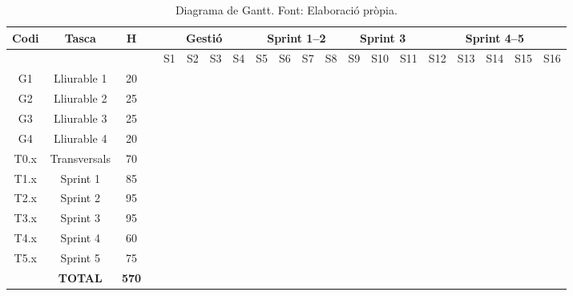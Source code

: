 \documentclass[12pt,a4paper,twoside]{report}
\begin{document}
\begin{table}[H]
\centering
\caption{Diagrama de Gantt. Font: Elaboraci\'o pr\`opia.}
\label{tab:gantt}
\small
\setlength{\tabcolsep}{2pt}
\begin{tabular}{@{}ccclcccccccccccccccc@{}}
\toprule
\textbf{Codi} & \textbf{Tasca} & \textbf{H} & & \multicolumn{4}{c}{\textbf{Gesti\'o}} & \multicolumn{4}{c}{\textbf{Sprint 1--2}} & \multicolumn{3}{c}{\textbf{Sprint 3}} & \multicolumn{5}{c}{\textbf{Sprint 4--5}} \\
\midrule
 & & & & S1 & S2 & S3 & S4 & S5 & S6 & S7 & S8 & S9 & S10 & S11 & S12 & S13 & S14 & S15 & S16 \\
\midrule
G1 & Lliurable 1 & 20 & & \cellcolor{blue!30} & \cellcolor{blue!30} & & & & & & & & & & & & & & \\
G2 & Lliurable 2 & 25 & & & \cellcolor{blue!30} & \cellcolor{blue!30} & & & & & & & & & & & & & \\
G3 & Lliurable 3 & 25 & & & & \cellcolor{blue!30} & \cellcolor{blue!30} & & & & & & & & & & & & \\
G4 & Lliurable 4 & 20 & & & & & \cellcolor{blue!30} & & & & & & & & & & & & \\
T0.x & Transversals & 70 & & \cellcolor{green!30} & \cellcolor{green!30} & \cellcolor{green!30} & \cellcolor{green!30} & \cellcolor{green!30} & \cellcolor{green!30} & \cellcolor{green!30} & \cellcolor{green!30} & \cellcolor{green!30} & \cellcolor{green!30} & \cellcolor{green!30} & \cellcolor{green!30} & \cellcolor{green!30} & \cellcolor{green!30} & \cellcolor{green!30} & \cellcolor{green!30} \\
T1.x & Sprint 1 & 85 & & \cellcolor{red!30} & \cellcolor{red!30} & \cellcolor{red!30} & \cellcolor{red!30} & \cellcolor{red!30} & & & & & & & & & & & \\
T2.x & Sprint 2 & 95 & & & & & & & \cellcolor{orange!30} & \cellcolor{orange!30} & \cellcolor{orange!30} & \cellcolor{orange!30} & & & & & & & \\
T3.x & Sprint 3 & 95 & & & & & & & & & & & \cellcolor{purple!30} & \cellcolor{purple!30} & \cellcolor{purple!30} & & & & \\
T4.x & Sprint 4 & 60 & & & & & & & & & & & & & & \cellcolor{teal!30} & \cellcolor{teal!30} & \cellcolor{teal!30} & \\
T5.x & Sprint 5 & 75 & & & & & & & & & & & & & & & & \cellcolor{yellow!30} & \cellcolor{yellow!30} \\
\midrule
 & \textbf{TOTAL} & \textbf{570} & & & & & & & & & & & & & & & & & \\
\bottomrule
\end{tabular}
\end{table}
\end{document}
